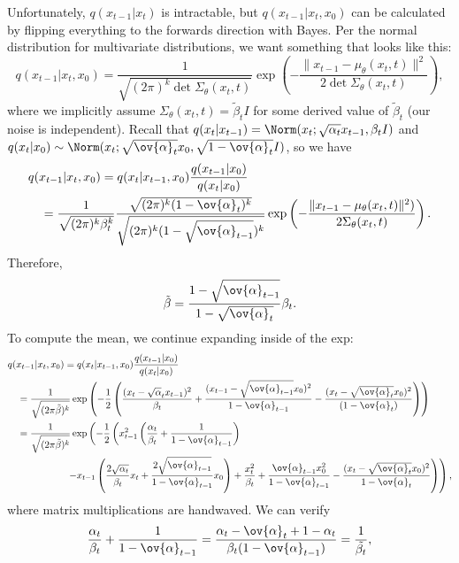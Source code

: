 Unfortunately, $q(x_{t-1}|x_t)$ is intractable, but $q(x_{t-1}|x_t,x_0)$ can be calculated by flipping everything to the forwards direction with Bayes. Per the normal distribution for multivariate distributions, we want something that looks like this: 
\[q(x_{t-1}|x_t,x_0) = \frac{1}{\sqrt{(2\pi)^k \det \Sigma_{\theta}(x_t,t)}}\exp\left(-\frac{\lVert x_{t-1} - \mu_{\theta}(x_t,t) \rVert^2}{2\det \Sigma_{\theta}(x_t,t)}\right),\] 
where we implicitly assume $\Sigma_{\theta}(x_t,t) = \tilde{\beta}_tI$ for some derived value of $\tilde{\beta}_t$ (our noise is independent). Recall that $q(x_t|x_{t-1}) = \Norm(x_t; \sqrt{\alpha_t}x_{t-1}, \beta_t I)$ and $q(x_{t}|x_{0})\sim \Norm(x_t; \sqrt{\ov{\alpha}_t}x_0, \sqrt{1-\ov{\alpha}_t}I)$, so we have 
\begin{align*}
	&q(x_{t-1}|x_t,x_0) = q(x_t|x_{t-1},x_0)\frac{q(x_{t-1}|x_0)}{q(x_t|x_0)}\\
	&\quad= \frac{1}{\sqrt{(2\pi)^k\beta_t^k}}\frac{\sqrt{(2\pi)^k(1-\ov{\alpha}_t)^k}}{\sqrt{(2\pi)^k(1-\sqrt{\ov{\alpha}_{t-1}})^k}}\exp\left(-\frac{\lVert x_{t-1} - \mu_{\theta}(x_t,t)\rVert^2)}{2\Sigma_{\theta}(x_t,t)}\right).
\end{align*}
Therefore,
\[\tilde{\beta} = \frac{1-\sqrt{\ov{\alpha}_{t-1}}}{1-\sqrt{\ov{\alpha}_t}}\beta_t.\]
To compute the mean, we continue expanding inside of the exp: 
\begin{align*}
	&q(x_{t-1}|x_t,x_0) = q(x_t|x_{t-1},x_0)\frac{q(x_{t-1}|x_0)}{q(x_t|x_0)} \\
	&\quad = \frac{1}{\sqrt{(2\pi\tilde{\beta})^k}}\exp\left(-\frac{1}{2}\left(\frac{(x_t - \sqrt{\alpha}_tx_{t-1})^2}{\beta_t} + \frac{(x_{t-1} - \sqrt{\ov{\alpha}_{t-1}}x_0)^2}{1-\ov{\alpha}_{t-1}} - \frac{(x_t-\sqrt{\ov{\alpha}_t}x_0)^2}{(1-\ov{\alpha}_t)}\right)\right) \\
	&\quad= \frac{1}{\sqrt{(2\pi\tilde{\beta})^k}}\exp\left(-\frac{1}{2}\left(x_{t-1}^2\left(\frac{\alpha_t}{\beta_t} + \frac{1}{1-\ov{\alpha}_{t-1}}\right)\right.\right. \\
	&\qquad\qquad\qquad \left.\left. -x_{t-1}\left(\frac{2\sqrt{\alpha_t}}{\beta_t}x_t + \frac{2\sqrt{\ov{\alpha}_{t-1}}}{1-\ov{\alpha}_{t-1}}x_0\right) + \frac{x_t^2}{\beta_t} + \frac{\ov{\alpha}_{t-1}x_0^2}{1-\ov{\alpha}_{t-1}} - \frac{(x_t-\sqrt{\ov{\alpha}_t}x_0)^2}{1-\ov{\alpha}_t}\right)\right),
\end{align*}
where matrix multiplications are handwaved. We can verify 
\[\frac{\alpha_t}{\beta_t} + \frac{1}{1-\ov{\alpha}_{t-1}} = \frac{\alpha_t-\ov{\alpha}_t + 1-\alpha_t}{\beta_t(1-\ov{\alpha}_{t-1})} = \frac{1}{\tilde{\beta_t}},\]
